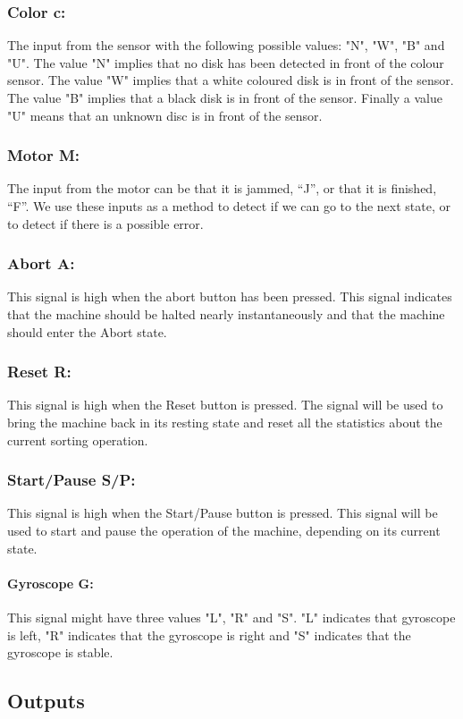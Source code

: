 \documentclass[a4paper,oneside,11pt]{article}
\begin{document}
\subsubsection{Color c:} The input from the sensor with the following possible values: "N", "W", "B" and "U". The value "N" implies that no disk has been detected in front of the colour sensor. The value "W" implies that a white coloured disk is in front of the sensor. The value "B" implies that a black disk is in front of the sensor. Finally a value "U" means that an unknown disc is in front of the sensor.
\subsubsection{Motor M:} The input from the motor can be that it is jammed, “J”, or that it is finished, “F”. We use these inputs as a method to detect if we can go to the next state, or to detect if there is a possible error.
\subsubsection{Abort A:} This signal is high when the abort button has been pressed. This signal indicates that the machine should be halted nearly instantaneously and that the machine should enter the Abort state.
\subsubsection{Reset R:} This signal is high when the Reset button is pressed. The signal will be used to bring the machine back in its resting state and reset all the statistics about the current sorting operation.
\subsubsection{Start/Pause S/P:} This signal is high when the Start/Pause button is pressed. This signal will be used to start and pause the operation of the machine, depending on its current state.
\paragraph{Gyroscope G:} This signal might have three values "L", "R" and "S". "L" indicates that gyroscope is left, "R" indicates that the gyroscope is right and "S" indicates that the gyroscope is stable.

\subsection{Outputs}
\end{document}
